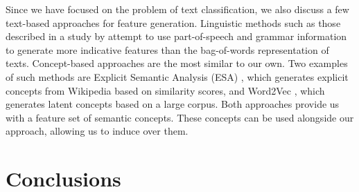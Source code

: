 \documentclass[letterpaper]{article} %
\theoremstyle{definition}
\begin{document}


Since we have focused on the problem of text classification, we also discuss a few text-based approaches for feature generation. 
Linguistic methods such as those described in a study by \citeauthor{moschitti2004complex} attempt to use part-of-speech and grammar information to generate more indicative features than the bag-of-words representation of texts.
Concept-based approaches are the most similar to our own. Two examples of such methods are Explicit Semantic Analysis (ESA) \cite{gabrilovich2009wikipediafull},  which generates explicit concepts from Wikipedia based on similarity scores, and Word2Vec , which generates latent concepts based on a large corpus. Both approaches provide us with a feature set of semantic concepts. These concepts can be used alongside our approach, allowing us to induce over them.

\section{Conclusions}
\end{document}
